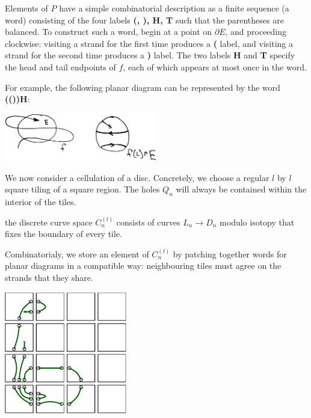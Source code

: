 \documentclass[12pt,a4paper]{article}
\begin{document}
Elements of $P$ have a simple combinatorial description 
as a finite sequence (a word) consisting of
the four labels {\bf (, ), H, T} such that 
the parentheses are balanced.
To construct such a word, begin at a point on $\partial E$, and proceeding
clockwise: visiting a strand for the first time produces a {\bf ( } label,
and visiting a strand for the second time produces a {\bf ) } label.
The two labels {\bf H} and {\bf T} specify the
head and tail endpoints of $f$, each of which appears at most once in the word.

For example, the following planar diagram can be represented by
the word {\bf(())H}:

\begin{center}
\includegraphics[width=0.5\textwidth]{planar.eps}
\end{center}




We now consider a cellulation of a disc.
Concretely, we choose a regular $l$ by $l$ square tiling of a square region.
The holes $Q_n$ will always be contained within the interior of the
tiles.

 the discrete curve space $C_n^{(l)}$ consists of
curves $L_n\to D_n$ modulo isotopy that fixes the boundary of
every tile.

Combinatorialy, we store an element of $C_n^{(l)}$ by patching
together words for planar diagrams in a compatible way: 
neighbouring tiles must agree on the strands that they share.

\begin{center}
\includegraphics[width=0.4\textwidth]{discrete-curve.eps}
\end{center}
\end{document}
